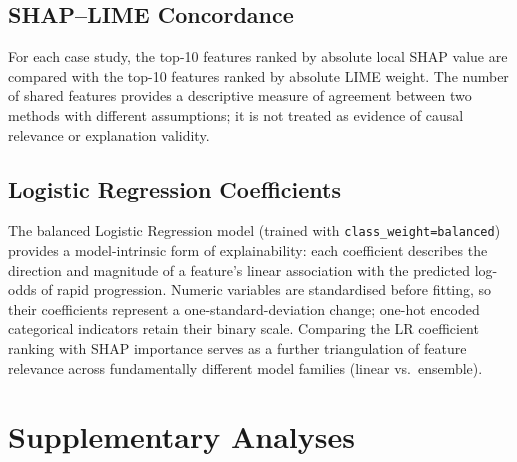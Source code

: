 \subsection{SHAP--LIME Concordance}
\label{subsec:methods_concordance}
For each case study, the top-10 features ranked by absolute local \gls{SHAP} value are compared with the top-10 features ranked by absolute \gls{LIME} weight.
The number of shared features provides a descriptive measure of agreement between two methods with different assumptions; it is not treated as evidence of causal relevance or explanation validity.

\subsection{Logistic Regression Coefficients}
\label{subsec:methods_lr_coefs}
The balanced Logistic Regression model (trained with \texttt{class\_weight=balanced}) provides a model-intrinsic form of explainability:
each coefficient describes the direction and magnitude of a feature's linear association with the predicted log-odds of rapid progression.
Numeric variables are standardised before fitting, so their coefficients represent a one-standard-deviation change; one-hot encoded categorical indicators retain their binary scale.
Comparing the \gls{LR} coefficient ranking with \gls{SHAP} importance serves as a further triangulation of feature relevance across fundamentally different model families (linear vs.\ ensemble).

\section{Supplementary Analyses}
\label{sec:methods_supplementary}

